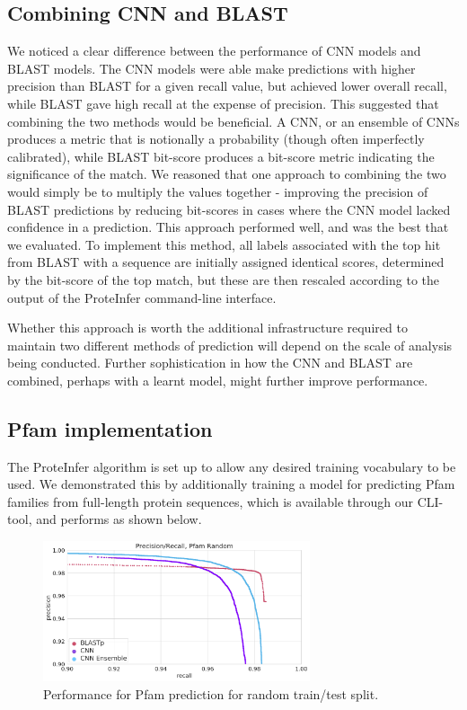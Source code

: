 \subsection{Combining CNN and BLAST}
We noticed a clear difference between the performance of CNN models and BLAST models. The CNN models were able make predictions with higher precision than BLAST for a given recall value, but achieved lower overall recall, while BLAST gave high recall at the expense of precision. This suggested that combining the two methods would be beneficial. A CNN, or an ensemble of CNNs produces a metric that is notionally a probability (though often imperfectly calibrated), while BLAST bit-score produces a bit-score metric indicating the significance of the match. We reasoned that one approach to combining the two would simply be to multiply the values together - improving the precision of BLAST predictions by reducing bit-scores in cases where the CNN model lacked confidence in a prediction. This approach performed well, and was the best that we evaluated. To implement this method, all labels associated with the top hit from BLAST with a sequence are initially assigned identical scores, determined by the bit-score of the top match, but these are then rescaled according to the output of the ProteInfer command-line interface.

Whether this approach is worth the additional infrastructure required to maintain two different methods of prediction will depend on the scale of analysis being conducted. Further sophistication in how the CNN and BLAST are combined, perhaps with a learnt model, might further improve performance.

\subsection{Pfam implementation}
The ProteInfer algorithm is set up to allow any desired training vocabulary to be used. We demonstrated this by additionally training a model for predicting Pfam families from full-length protein sequences, which is available through our CLI-tool, and performs as shown below.

\begin{figure}[htbp]
\centering
  \includegraphics[width=0.7\textwidth]{pfam_random.png}
  \caption{Performance for Pfam prediction for random train/test split.}
  \label{sup:fig:ec_f1_by_training_size}
\end{figure}






%


